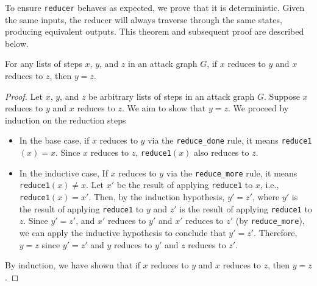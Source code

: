 \documentclass[runningheads]{llncs}
\theoremstyle{definition}
\newcommand{\squash}{\itemsep=0pt\parskip=0pt}
\begin{document}

To ensure \texttt{reducer} behaves as expected, we prove that it is deterministic. Given the same inputs, the reducer will always traverse through the same states, producing equivalent outputs. This theorem and subsequent proof are described below.

\begin{theorem}
    For any lists of steps $x$, $y$, and $z$ in an attack graph $G$, if $x$ reduces to $y$ and $x$ reduces to $z$, then $y=z$.
\end{theorem}
\begin{proof}
Let $x$, $y$, and $z$ be arbitrary lists of steps in an attack graph $G$. Suppose $x$ reduces to $y$ and $x$ reduces to $z$. We aim to show that $y = z$. We proceed by induction on the reduction steps

\begin{itemize}
    \squash
    \item In the base case, if $x$ reduces to $y$ via the \texttt{reduce\_done} rule, it means \texttt{reduce1}$(x) = x$. Since $x$ reduces to $z$, \texttt{reduce1}$(x)$  also reduces to $z$.
    \item In the inductive case, If $x$ reduces to $y$ via the \texttt{reduce\_more} rule, it means \texttt{reduce1}$(x) \neq x$. Let $x'$ be the result of applying \texttt{reduce1} to $x$, i.e., \texttt{reduce1}$(x)= x'$. Then, by the induction hypothesis, $y' = z'$, where $y'$ is the result of applying \texttt{reduce1} to $y$ and $z'$ is the result of applying \texttt{reduce1} to $z$. Since $y' = z'$, and $x'$ reduces to $y'$ and $x'$ reduces to $z'$ (by \texttt{reduce\_more}), we can apply the inductive hypothesis to conclude that $y' = z'$. Therefore, $y = z$ since $y' = z'$ and $y$ reduces to $y'$ and $z$ reduces to $z'$.
\end{itemize}

By induction, we have shown that if $x$ reduces to $y$ and $x$ reduces to $z$, then $y = z$.
\end{proof}
\end{document}
